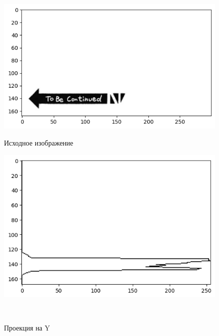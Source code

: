 \documentclass[a4paper,12pt]{article}
\begin{document}
\begin{figure}[H]
    \begin{minipage}{0.5\textwidth}
        \centering \includegraphics[width=\textwidth]{images/im.png}
        \caption{Исходное изображение}
    \end{minipage}
    \begin{minipage}{0.4\textwidth}
        \centering \includegraphics[width=\textwidth]{images/im_pr_y.png}
        \caption{Проекция на Y}
    \end{minipage}\\
    \begin{minipage}{0.5\textwidth}

\end{minipage}
\end{figure}
\end{document}
